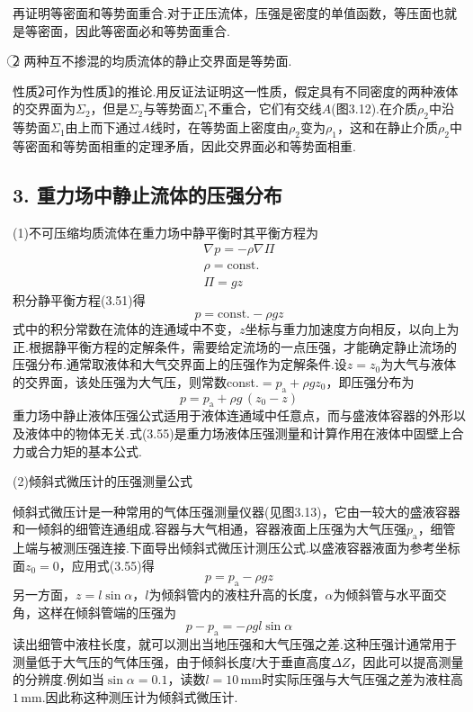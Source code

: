 再证明等密面和等势面重合.对于正压流体，压强是密度的单值函数，等压面也就是等密面，因此等密面必和等势面重合.

\textcircled{2} 两种互不掺混的均质流体的静止交界面是等势面.

性质\textcircled{2}可作为性质\textcircled{1}的推论.用反证法证明这一性质，假定具有不同密度的两种液体的交界面为$\Sigma_2$，但是$\Sigma_2$与等势面$\Sigma_1$不重合，它们有交线$A$(图3.12).在介质$\rho_2$中沿等势面$\Sigma_1$由上而下通过$A$线时，在等势面上密度由$\rho_2$变为$\rho_1$，这和在静止介质$\rho_2$中等密面和等势面相重的定理矛盾，因此交界面必和等势面相重.

\subsection*{3. 重力场中静止流体的压强分布}

(1)不可压缩均质流体在重力场中静平衡时其平衡方程为
\begin{gather*}
\nabla p=-\rho\nabla\Pi\tag{3.51}\\
\rho=\mathrm{const.}\tag{3.52}\\
\Pi=gz\tag{3.53}
\end{gather*}
积分静平衡方程(3.51)得
\begin{equation*}
p=\mathrm{const.}-\rho g z
\tag{3.54}
\end{equation*}
式中的积分常数在流体的连通域中不变，$z$坐标与重力加速度方向相反，以向上为正.根据静平衡方程的定解条件，需要给定流场的一点压强，才能确定静止流场的压强分布.通常取液体和大气交界面上的压强作为定解条件.设$z=z_0$为大气与液体的交界面，该处压强为大气压，则常数const.$=p_{\mathrm{a}}+\rho g z_0$，即压强分布为
\begin{equation*}
p=p_{\mathrm{a}}+\rho g\,(z_0-z)
\tag{3.55}
\end{equation*}
重力场中静止液体压强公式适用于液体连通域中任意点，而与盛液体容器的外形以及液体中的物体无关.式(3.55)是重力场液体压强测量和计算作用在液体中固壁上合力或合力矩的基本公式.

(2)倾斜式微压计的压强测量公式

倾斜式微压计是一种常用的气体压强测量仪器(见图3.13)，它由一较大的盛液容器和一倾斜的细管连通组成.容器与大气相通，容器液面上压强为大气压强$p_{\mathrm{a}}$，细管上端与被测压强连接.下面导出倾斜式微压计测压公式.以盛液容器液面为参考坐标面$z_0=0$，应用式(3.55)得
\[
p=p_{\mathrm{a}}-\rho g z
\]
另一方面，$z=l\sin\alpha$，$l$为倾斜管内的液柱升高的长度，$\alpha$为倾斜管与水平面交角，这样在倾斜管端的压强为
\[
p-p_{\mathrm{a}}=-\rho g l\sin\alpha
\]
读出细管中液柱长度，就可以测出当地压强和大气压强之差.这种压强计通常用于测量低于大气压的气体压强，由于倾斜长度$l$大于垂直高度$\Delta Z$，因此可以提高测量的分辨度.例如当$\sin\alpha=0.1$，读数$l=10\,$mm时实际压强与大气压强之差为液柱高$1\,$mm.因此称这种测压计为倾斜式微压计.


